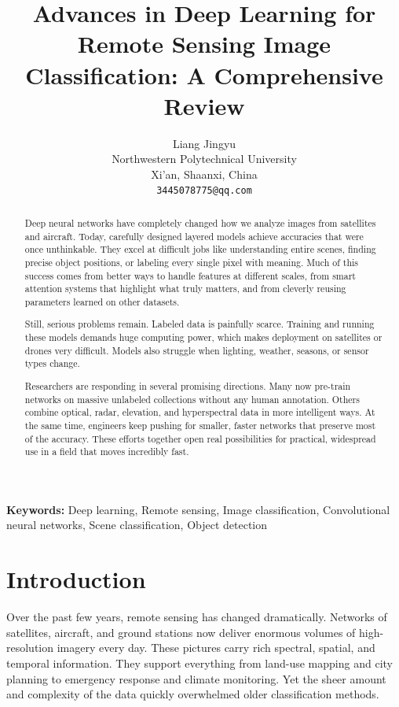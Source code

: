 \documentclass[12pt,a4paper]{article}
\title{\fontsize{14}{17}\selectfont\textbf{Advances in Deep Learning for Remote Sensing Image Classification: A Comprehensive Review}}
\author{Liang Jingyu\\
        Northwestern Polytechnical University\\
        Xi'an, Shaanxi, China\\
        \texttt{3445078775@qq.com}}
\date{}
\begin{document}
\maketitle

\begin{abstract}
Deep neural networks have completely changed how we analyze images from satellites and aircraft. Today, carefully designed layered models achieve accuracies that were once unthinkable. They excel at difficult jobs like understanding entire scenes, finding precise object positions, or labeling every single pixel with meaning. Much of this success comes from better ways to handle features at different scales, from smart attention systems that highlight what truly matters, and from cleverly reusing parameters learned on other datasets.

Still, serious problems remain. Labeled data is painfully scarce. Training and running these models demands huge computing power, which makes deployment on satellites or drones very difficult. Models also struggle when lighting, weather, seasons, or sensor types change.

Researchers are responding in several promising directions. Many now pre-train networks on massive unlabeled collections without any human annotation. Others combine optical, radar, elevation, and hyperspectral data in more intelligent ways. At the same time, engineers keep pushing for smaller, faster networks that preserve most of the accuracy. These efforts together open real possibilities for practical, widespread use in a field that moves incredibly fast.
\end{abstract}

\textbf{Keywords:} Deep learning, Remote sensing, Image classification, Convolutional neural networks, Scene classification, Object detection

\section{Introduction}
\label{sec:introduction}

Over the past few years, remote sensing has changed dramatically. Networks of satellites, aircraft, and ground stations now deliver enormous volumes of high-resolution imagery every day. These pictures carry rich spectral, spatial, and temporal information. They support everything from land-use mapping and city planning to emergency response and climate monitoring. Yet the sheer amount and complexity of the data quickly overwhelmed older classification methods.
\end{document}

